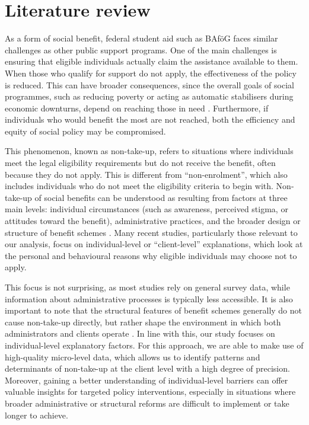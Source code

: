 \section{Literature review}
\label{section:literature_review}

As a form of social benefit, federal student aid such as BAföG faces similar challenges as other public support programs. 
One of the main challenges is ensuring that eligible individuals actually claim the assistance available to them. 
When those who qualify for support do not apply, the effectiveness of the policy is reduced. 
This can have broader consequences, since the overall goals of social programmes, such as reducing poverty or acting as automatic stabilisers during economic downturns, depend on reaching those in need \citep{goedeme_concept_2020}. 
Furthermore, if individuals who would benefit the most are not reached, both the efficiency and equity of social policy may be compromised.

This phenomenon, known as non-take-up, refers to situations where individuals meet the legal eligibility requirements but do not receive the benefit, often because they do not apply. 
This is different from “non-enrolment”, which also includes individuals who do not meet the eligibility criteria to begin with. 
Non-take-up of social benefits can be understood as resulting from factors at three main levels: individual circumstances (such as awareness, perceived stigma, or attitudes toward the benefit), administrative practices, and the broader design or structure of benefit schemes \citep{vanoorschot_failing_2002}. 
Many recent studies, particularly those relevant to our analysis, focus on individual-level or “client-level” explanations, which look at the personal and behavioural reasons why eligible individuals may choose not to apply.

This focus is not surprising, as most studies rely on general survey data, while information about administrative processes is typically less accessible. It is also important to note that the structural features of benefit schemes generally do not cause non-take-up directly, but rather shape the environment in which both administrators and clients operate \citep{vanoorschot_failing_2002}. In line with this, our study focuses on individual-level explanatory factors. For this approach, we are able to make use of high-quality micro-level data, which allows us to identify patterns and determinants of non-take-up at the client level with a high degree of precision. Moreover, gaining a better understanding of individual-level barriers can offer valuable insights for targeted policy interventions, especially in situations where broader administrative or structural reforms are difficult to implement or take longer to achieve.

